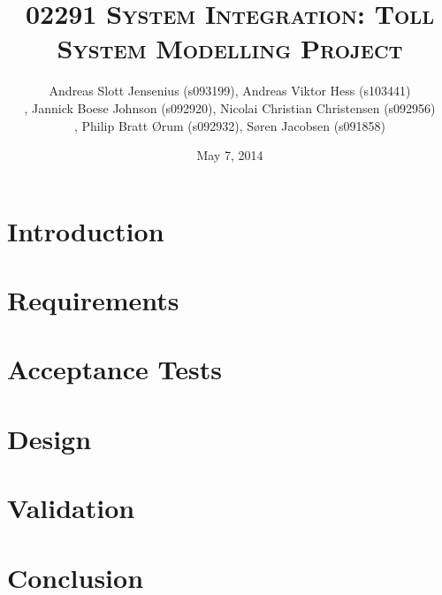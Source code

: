 \documentclass[11pt]{report}
\begin{document}
\title{\textsc{02291 System Integration: Toll System Modelling Project}}
\date{May 7, 2014}
\author{Andreas Slott Jensenius (s093199), Andreas Viktor Hess (s103441)\\,
        Jannick Boese Johnson (s092920), Nicolai Christian Christensen (s092956)\\,
        Philip Bratt Ørum (s092932), Søren Jacobsen (s091858)}
        

\maketitle

\fancyhead{}
\fancyfoot{}
\fancyfoot[C]{\thepage}

\pagestyle{fancy}

\tableofcontents

\chapter{Introduction}



\chapter{Requirements}


\chapter{Acceptance Tests}


\chapter{Design}


\chapter{Validation}


\chapter{Conclusion}

\end{document}
